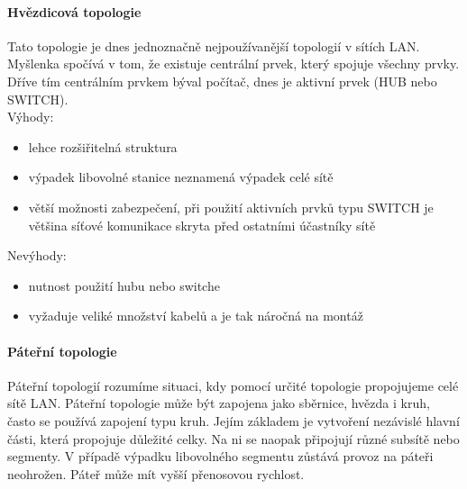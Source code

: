 \documentclass[10pt,a4paper]{article}
\begin{document}
\paragraph{Hvězdicová topologie}
Tato topologie je dnes jednoznačně nejpoužívanější topologií v sítích LAN. Myšlenka spočívá v tom, že existuje centrální prvek, který spojuje všechny prvky. Dříve tím centrálním prvkem býval počítač, dnes je aktivní prvek (HUB nebo SWITCH). \\
Výhody:
\begin{itemize}
	\item lehce rozšiřitelná struktura
	\item výpadek libovolné stanice neznamená výpadek celé sítě
	\item větší možnosti zabezpečení, při použití aktivních prvků typu SWITCH je většina síťové komunikace skryta před ostatními účastníky sítě
\end{itemize}
Nevýhody:
\begin{itemize}
	\item nutnost použití hubu nebo switche
	\item vyžaduje veliké množství kabelů a je tak náročná na montáž
\end{itemize}
\paragraph{Páteřní topologie}
Páteřní topologií rozumíme situaci, kdy pomocí určité topologie propojujeme celé sítě LAN. Páteřní topologie může být zapojena jako sběrnice, hvězda i kruh, často se používá zapojení typu kruh. Jejím základem je vytvoření nezávislé hlavní části, která propojuje důležité celky. Na ni se naopak připojují různé subsítě nebo segmenty. V případě výpadku libovolného segmentu zůstává provoz na páteři neohrožen. Páteř může mít vyšší přenosovou rychlost.
\end{document}
